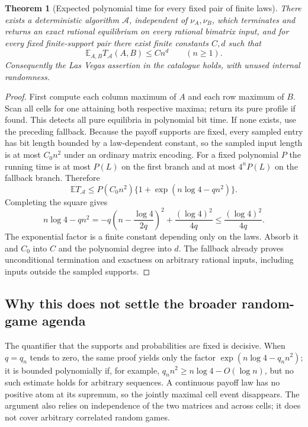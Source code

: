 \documentclass[11pt,a4paper]{article}
\newtheorem{theorem}{Theorem}
\newcommand{\E}{\mathbb E}
\begin{document}
\begin{theorem}[Expected polynomial time for every fixed pair of finite laws]
There exists a deterministic algorithm $\mathcal A$, independent of $\nu_A,\nu_B$, which terminates and returns an exact rational equilibrium on every rational bimatrix input, and for every fixed finite-support pair there exist finite constants $C,d$ such that
\[
 \E_{A,B}T_{\mathcal A}(A,B)\leq Cn^d\qquad(n\geq1).
\]
Consequently the Las Vegas assertion in the catalogue holds, with unused internal randomness.
\end{theorem}
\begin{proof}
First compute each column maximum of $A$ and each row maximum of $B$. Scan all cells for one attaining both respective maxima; return its pure profile if found. This detects all pure equilibria in polynomial bit time. If none exists, use the preceding fallback.
Because the payoff supports are fixed, every sampled entry has bit length bounded by a law-dependent constant, so the sampled input length is at most $C_0n^2$ under an ordinary matrix encoding. For a fixed polynomial $P$ the running time is at most $P(L)$ on the first branch and at most $4^nP(L)$ on the fallback branch. Therefore
\[
 \E T_{\mathcal A}\leq P(C_0n^2)
       \{1+\exp(n\log4-qn^2)\}.
\]
Completing the square gives
\[
 n\log4-qn^2
 =-q\left(n-\frac{\log4}{2q}\right)^2
                  +\frac{(\log4)^2}{4q}
 \leq\frac{(\log4)^2}{4q}.
\]
The exponential factor is a finite constant depending only on the laws. Absorb it and $C_0$ into $C$ and the polynomial degree into $d$. The fallback already proves unconditional termination and exactness on arbitrary rational inputs, including inputs outside the sampled supports.
\end{proof}

\subsection*{Why this does not settle the broader random-game agenda}
The quantifier that the supports and probabilities are fixed is decisive. When $q=q_n$ tends to zero, the same proof yields only the factor $\exp(n\log4-q_nn^2)$; it is bounded polynomially if, for example, $q_nn^2\geq n\log4-O(\log n)$, but no such estimate holds for arbitrary sequences. A continuous payoff law has no positive atom at its supremum, so the jointly maximal cell event disappears. The argument also relies on independence of the two matrices and across cells; it does not cover arbitrary correlated random games.
\end{document}
